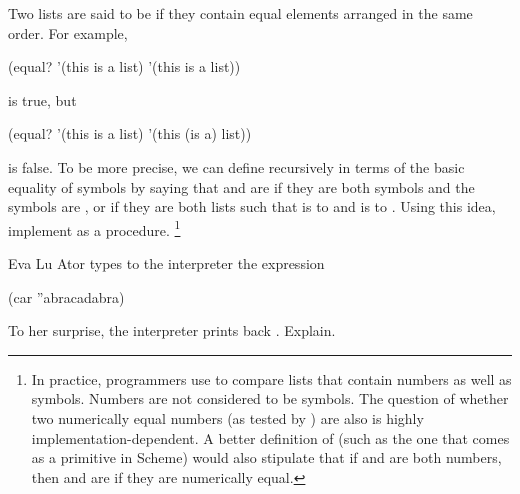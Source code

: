 \begin{exercise}
	\label{Exercise 2.54}
	Two lists are said to be  if they contain equal elements arranged in the same order.
	For example,
	\begin{scheme}
	  (equal? '(this is a list) '(this is a list))
	\end{scheme}
	is true, but
	\begin{scheme}
	  (equal? '(this is a list) '(this (is a) list))
	\end{scheme}
	is false.
	To be more precise, we can define  recursively in terms of the basic  equality of symbols by saying that  and  are  if they are both symbols and the symbols are , or if they are both lists such that  is  to  and  is  to .
	Using this idea, implement  as a procedure.%
	\footnote{
		In practice, programmers use  to compare lists that contain numbers as well as symbols.
		Numbers are not considered to be symbols.
		The question of whether two numerically equal numbers (as tested by \code{=}) are also  is highly implementation-dependent.
		A better definition of  (such as the one that comes as a primitive in Scheme) would also stipulate that if  and  are both numbers, then  and  are  if they are numerically equal.
	}
\end{exercise}



\begin{exercise}
	\label{Exercise 2.55}
	Eva Lu Ator types to the interpreter the expression
	\begin{scheme}
	  (car ''abracadabra)
	\end{scheme}
	To her surprise, the interpreter prints back .
	Explain.
\end{exercise}
